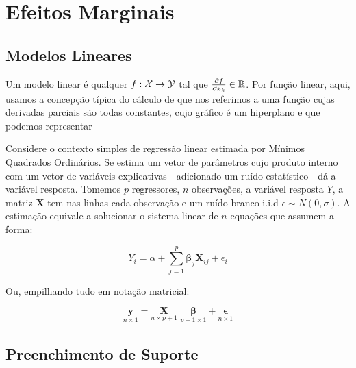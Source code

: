 
\chapter{Efeitos Marginais}

\section{Modelos Lineares}

Um modelo linear é qualquer $f: \mathcal{X} \to \mathcal{Y}$ tal que $\frac{\partial f}{\partial x_k} \in \mathbb{R}$. Por função linear, aqui, usamos a concepção típica do cálculo de que nos referimos a uma função cujas derivadas parciais são todas constantes, cujo gráfico é um hiperplano e que podemos representar

Considere o contexto simples de regressão linear estimada por Mínimos Quadrados Ordinários. Se estima um vetor de parâmetros cujo produto interno com um vetor de variáveis explicativas - adicionado um ruído estatístico - dá a variável resposta. Tomemos $p$ regressores, $n$ observações, a variável resposta $Y$, a matriz $\mathbf{X}$ tem nas linhas cada observação e um ruído branco i.i.d $\epsilon \sim N(0, \sigma)$. A estimação equivale a solucionar o sistema linear de $n$ equações que assumem a forma:

\begin{equation}
    Y_i = \alpha + \sum_{j = 1}^{p} \boldsymbol{\beta}_j \mathbf{X}_{ij} + \epsilon_i 
\end{equation}

Ou, empilhando tudo em notação matricial:

\begin{equation}
    \underset{n \times 1}{\mathbf{y}} = \underset{n \times p+1}{\mathbf{X}} \,\, \underset{p+1 \times 1}{\boldsymbol{\beta}}   + \underset{n \times 1}{\boldsymbol{\epsilon}}
\end{equation}



\section{Preenchimento de Suporte}